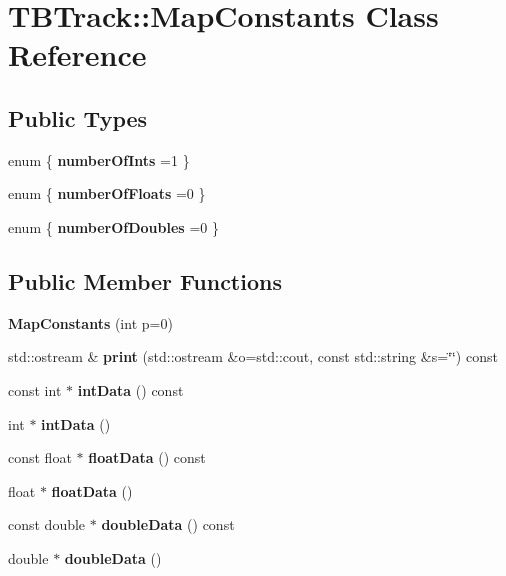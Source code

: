 \section{T\-B\-Track\-:\-:Map\-Constants Class Reference}
\label{classTBTrack_1_1MapConstants}
\subsection*{Public Types}
\begin{DoxyCompactItemize}
\item 
enum \{ {\bfseries number\-Of\-Ints} =1
 \}
\item 
enum \{ {\bfseries number\-Of\-Floats} =0
 \}
\item 
enum \{ {\bfseries number\-Of\-Doubles} =0
 \}
\end{DoxyCompactItemize}
\subsection*{Public Member Functions}
\begin{DoxyCompactItemize}
\item 
{\bfseries Map\-Constants} (int p=0)\label{classTBTrack_1_1MapConstants_ad6a908a71ad6e73996a27429b7ba4485}

\item 
std\-::ostream \& {\bfseries print} (std\-::ostream \&o=std\-::cout, const std\-::string \&s=\char`\"{}\char`\"{}) const \label{classTBTrack_1_1MapConstants_abf0ecdc32902053ca7bacf7ab68d6166}

\item 
const int $\ast$ {\bfseries int\-Data} () const \label{classTBTrack_1_1MapConstants_aeaffabb97fe13e54bca6a2ccfcf5dcf4}

\item 
int $\ast$ {\bfseries int\-Data} ()\label{classTBTrack_1_1MapConstants_a64090ab098d7b42996eb37ac0181c6d9}

\item 
const float $\ast$ {\bfseries float\-Data} () const \label{classTBTrack_1_1MapConstants_a5db3dc38042fe8bc9fd1346eddbf2b43}

\item 
float $\ast$ {\bfseries float\-Data} ()\label{classTBTrack_1_1MapConstants_a25791641151a9a929d1cc7d9cb080976}

\item 
const double $\ast$ {\bfseries double\-Data} () const \label{classTBTrack_1_1MapConstants_a2dc86123f3989ad6f8e633aacec4c918}

\item 
double $\ast$ {\bfseries double\-Data} ()\label{classTBTrack_1_1MapConstants_a0b3f2db804b686ebd71e35d718564853}

\end{DoxyCompactItemize}
